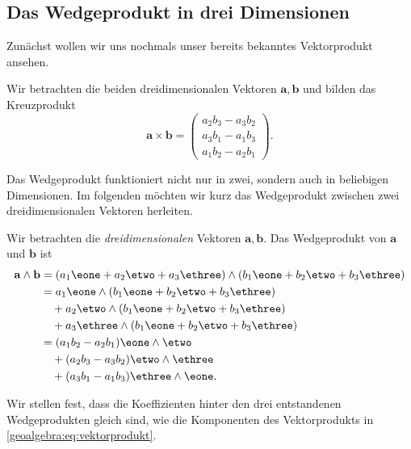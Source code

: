 \subsection{Das Wedgeprodukt in drei Dimensionen}
Zunächst wollen wir uns nochmals unser bereits bekanntes
Vektorprodukt ansehen.
\begin{definition}
  Wir betrachten die beiden dreidimensionalen Vektoren $\mathbf{a}, \mathbf{b}$
  und bilden das Kreuzprodukt
  \begin{equation}
    \mathbf{a} \times \mathbf{b} = \begin{pmatrix} a_2 b_3 - a_3 b_2 \\ a_3 b_1 - a_1 b_3 \\ a_1 b_2 - a_2 b_1 \end{pmatrix}.
    \label{geoalgebra:eq:vektorprodukt}
  \end{equation}
  
\end{definition}

Das Wedgeprodukt funktioniert nicht nur in zwei, sondern auch
in beliebigen Dimensionen. Im folgenden möchten wir kurz
das Wedgeprodukt zwischen zwei dreidimensionalen Vektoren
herleiten.

\begin{definition}
Wir betrachten die \emph{dreidimensionalen} Vektoren $\mathbf{a}, \mathbf{b}$.
Das Wedgeprodukt von $\mathbf{a}$ und $\mathbf{b}$ ist
\begin{equation}
  \begin{aligned}
      \mathbf{a} \wedge \mathbf{b} &= (a_1 \eone + a_2 \etwo + a_3 \ethree) \wedge (b_1 \eone + b_2 \etwo + b_3 \ethree) \\
      &= a_1 \eone \wedge (b_1 \eone + b_2 \etwo + b_3 \ethree) \\
      &\quad+ a_2 \etwo \wedge (b_1 \eone + b_2 \etwo + b_3 \ethree) \\
      &\quad+ a_3 \ethree \wedge (b_1 \eone + b_2 \etwo + b_3 \ethree) \\
      &= (a_1 b_2 - a_2 b_1) \eone \wedge \etwo \\
      &\quad+ (a_2 b_3 - a_3 b_2) \etwo \wedge \ethree \\
      &\quad+ (a_3 b_1 - a_1 b_3) \ethree \wedge \eone.
  \end{aligned}
\end{equation}
\end{definition}
Wir stellen fest, dass die Koeffizienten hinter den drei entstandenen Wedgeprodukten
gleich sind, wie die Komponenten des Vektorprodukts in \eqref{geoalgebra:eq:vektorprodukt}.

